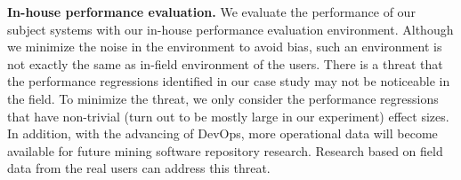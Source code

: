 \textbf{In-house performance evaluation.} We evaluate the performance of our subject systems with our in-house performance evaluation environment. Although we minimize the noise in the environment to avoid bias, such an environment is not exactly the same as in-field environment of the users. There is a threat that the performance regressions identified in our case study may not be noticeable in the field. To minimize the threat, we only consider the performance regressions that have non-trivial (turn out to be mostly large in our experiment) effect sizes. In addition, with the advancing of DevOps, more operational data will become available for future mining software repository research. Research based on field data from the real users can address this threat. 











